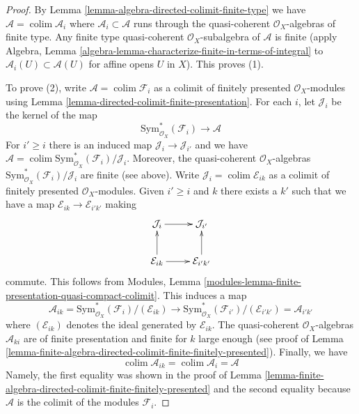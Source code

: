 \documentclass{stacks-project}
\theoremstyle{plain}
\theoremstyle{definition}
\theoremstyle{remark}
\numberwithin{equation}{subsection}
\def\colim{\mathop{\mathrm{colim}}\nolimits}
\begin{document}
\begin{proof}
By Lemma \ref{lemma-algebra-directed-colimit-finite-type} we have
$\mathcal{A} = \colim \mathcal{A}_i$ where
$\mathcal{A}_i \subset \mathcal{A}$ runs through the
quasi-coherent $\mathcal{O}_X$-algebras of finite type.
Any finite type quasi-coherent $\mathcal{O}_X$-subalgebra
of $\mathcal{A}$ is finite (apply Algebra, Lemma
\ref{algebra-lemma-characterize-finite-in-terms-of-integral}
to $\mathcal{A}_i(U) \subset \mathcal{A}(U)$ for affine opens $U$
in $X$). This proves (1).

\medskip\noindent
To prove (2), write $\mathcal{A} = \colim \mathcal{F}_i$
as a colimit of finitely presented $\mathcal{O}_X$-modules using
Lemma \ref{lemma-directed-colimit-finite-presentation}.
For each $i$, let $\mathcal{J}_i$ be the kernel of the map
$$
\text{Sym}^*_{\mathcal{O}_X}(\mathcal{F}_i) \longrightarrow \mathcal{A}
$$
For $i' \geq i$ there is an induced map $\mathcal{J}_i \to \mathcal{J}_{i'}$
and we have $\mathcal{A} =
\colim \text{Sym}^*_{\mathcal{O}_X}(\mathcal{F}_i)/\mathcal{J}_i$.
Moreover, the quasi-coherent $\mathcal{O}_X$-algebras
$\text{Sym}^*_{\mathcal{O}_X}(\mathcal{F}_i)/\mathcal{J}_i$
are finite (see above). Write $\mathcal{J}_i = \colim \mathcal{E}_{ik}$
as a colimit of finitely presented $\mathcal{O}_X$-modules.
Given $i' \geq i$ and $k$ there exists a $k'$ such that we
have a map $\mathcal{E}_{ik} \to \mathcal{E}_{i'k'}$
making
$$
\xymatrix{
\mathcal{J}_i \ar[r] & \mathcal{J}_{i'} \\
\mathcal{E}_{ik} \ar[u] \ar[r] & \mathcal{E}_{i'k'} \ar[u]
}
$$
commute. This follows from
Modules, Lemma \ref{modules-lemma-finite-presentation-quasi-compact-colimit}.
This induces a map
$$
\mathcal{A}_{ik} =
\text{Sym}^*_{\mathcal{O}_X}(\mathcal{F}_i)/(\mathcal{E}_{ik})
\longrightarrow
\text{Sym}^*_{\mathcal{O}_X}(\mathcal{F}_{i'})/(\mathcal{E}_{i'k'}) =
\mathcal{A}_{i'k'}
$$
where $(\mathcal{E}_{ik})$ denotes the ideal generated by $\mathcal{E}_{ik}$.
The quasi-coherent $\mathcal{O}_X$-algebras $\mathcal{A}_{ki}$
are of finite presentation and finite for $k$ large enough
(see proof of
Lemma \ref{lemma-finite-algebra-directed-colimit-finite-finitely-presented}).
Finally, we have
$$
\colim \mathcal{A}_{ik} = \colim \mathcal{A}_i = \mathcal{A}
$$
Namely, the first equality was shown in the proof of
Lemma \ref{lemma-finite-algebra-directed-colimit-finite-finitely-presented}
and the second equality because $\mathcal{A}$ is the colimit of
the modules $\mathcal{F}_i$.
\end{proof}
\end{document}
